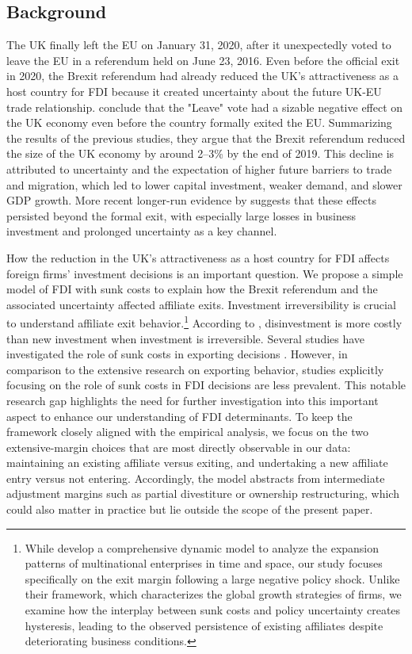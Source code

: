 \documentclass[preprint,11pt,authoryear]{elsarticle}
\begin{document}
\subsection{Background}

The UK finally left the EU on January 31, 2020, after it unexpectedly voted to leave the EU in a referendum held on June 23, 2016.
Even before the official exit in 2020, the Brexit referendum had already reduced the UK's attractiveness as a host country for FDI because it created uncertainty about the future UK-EU trade relationship. 
\cite{dhingra2022expecting} conclude that the "Leave" vote had a sizable negative effect on the UK economy even before the country formally exited the EU. Summarizing the results of the previous studies, they argue that the Brexit referendum reduced the size of the UK economy by around 2--3\% by the end of 2019.
This decline is attributed to uncertainty and the expectation of higher future barriers to trade and migration, which led to lower capital investment, weaker demand, and slower GDP growth.
More recent longer-run evidence by \citet{bloom2025economic} suggests that these effects persisted beyond the formal exit, with especially large losses in business investment and prolonged uncertainty as a key channel.

How the reduction in the UK's attractiveness as a host country for FDI affects foreign firms' investment decisions is an important question. 
We propose a simple model of FDI with sunk costs to explain how the Brexit referendum and the associated uncertainty affected affiliate exits.
Investment irreversibility is crucial to understand affiliate exit behavior.\footnote{While \cite{garetto2019} develop a comprehensive dynamic model to analyze the expansion patterns of multinational enterprises in time and space, our study focuses specifically on the exit margin following a large negative policy shock. Unlike their framework, which characterizes the global growth strategies of firms, we examine how the interplay between sunk costs and policy uncertainty creates hysteresis, leading to the observed persistence of existing affiliates despite deteriorating business conditions.}
According to \cite{kim2017asset}, disinvestment is more costly than new investment when investment is irreversible.
Several studies have investigated the role of sunk costs in exporting decisions \citep{roberts1997decision,das2007market,handley2015trade,graziano2021brexit}. However, in comparison to the extensive research on exporting behavior, studies explicitly focusing on the role of sunk costs in FDI decisions are less prevalent. This notable research gap highlights the need for further investigation into this important aspect to enhance our understanding of FDI determinants.
To keep the framework closely aligned with the empirical analysis, we focus on the two extensive-margin choices that are most directly observable in our data: maintaining an existing affiliate versus exiting, and undertaking a new affiliate entry versus not entering. Accordingly, the model abstracts from intermediate adjustment margins such as partial divestiture or ownership restructuring, which could also matter in practice but lie outside the scope of the present paper.
\end{document}
